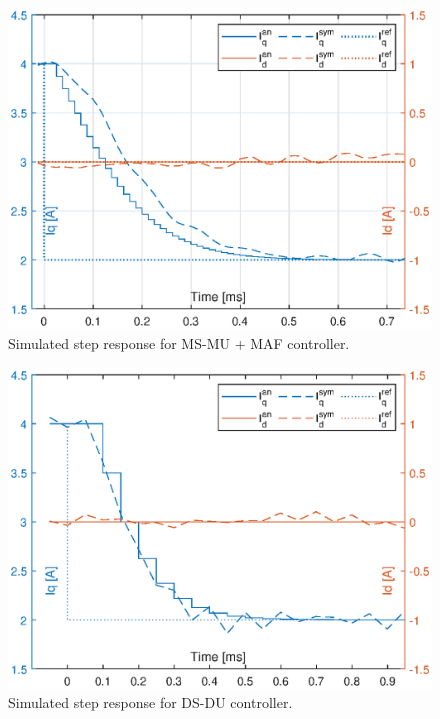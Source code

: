 \documentclass[journal]{IEEEtran}
\begin{document}
\begin{figure}[t!]
    \centerline{\includegraphics[width=0.95\linewidth]{figures/MSMUmaf_step.eps}}
    \caption{Simulated step response for MS-MU + MAF controller.}
    \label{fig:MSMUmaf_step} 
\end{figure}
\begin{figure}[t!]
    \centerline{\includegraphics[width=0.95\linewidth]{figures/DSDU_step.eps}}
    \caption{Simulated step response for DS-DU controller.}
    \label{fig:DSDU_step} 
\end{figure}
\end{document}
